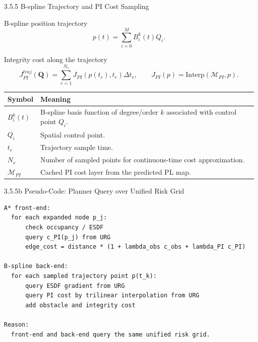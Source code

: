 \documentclass[10pt,aspectratio=169,xcolor=dvipsnames]{beamer}
\newcommand{\Interp}{\mathrm{Interp}}
\newcommand{\Mmap}{\mathcal{M}}
\begin{document}
\begin{frame}{3.5.5 B-spline Trajectory and PI Cost Sampling}
  \small
  \begin{block}{B-spline position trajectory}
    \[
      p(t)=\sum_{i=0}^{M}B_i^k(t)Q_i.
    \]
  \end{block}

  \begin{block}{Integrity cost along the trajectory}
    \[
      J_{PI}^{traj}(\mathbf{Q})=\sum_{r=1}^{N_s}J_{PI}\left(p(t_r),t_r\right)\Delta t_r,
      \qquad
      J_{PI}(p)=\Interp(\Mmap_{PI},p).
    \]
  \end{block}

  \begin{table}\scriptsize
    \begin{tabular}{p{} p{}}
      \toprule
      \textbf{Symbol} & \textbf{Meaning}\\
      \midrule
      $B_i^k(t)$ & B-spline basis function of degree/order $k$ associated with control point $Q_i$.\\
      $Q_i$ & Spatial control point.\\
      $t_r$ & Trajectory sample time.\\
      $N_s$ & Number of sampled points for continuous-time cost approximation.\\
      $\Mmap_{PI}$ & Cached PI cost layer from the predicted PL map.\\
      \bottomrule
    \end{tabular}
  \end{table}
\end{frame}

\begin{frame}[fragile]{3.5.5b Pseudo-Code: Planner Query over Unified Risk Grid}
\begin{lstlisting}
A* front-end:
  for each expanded node p_j:
      check occupancy / ESDF
      query c_PI(p_j) from URG
      edge_cost = distance * (1 + lambda_obs c_obs + lambda_PI c_PI)

B-spline back-end:
  for each sampled trajectory point p(t_k):
      query ESDF gradient from URG
      query PI cost by trilinear interpolation from URG
      add obstacle and integrity cost

Reason:
  front-end and back-end query the same unified risk grid.
\end{lstlisting}
\end{frame}
\end{document}

